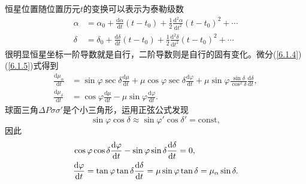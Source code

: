 \documentclass[11pt, a4paper, oneside]{ctexart}
\numberwithin{equation}{subsection}
\begin{document}
恒星位置随位置历元$t$的变换可以表示为泰勒级数
\begin{align}
\alpha&=\alpha_0+\frac{\mathrm{d}\alpha}{\mathrm{d}t}\left(t-t_0\right)+\frac12\frac{\mathrm{d}^2\alpha}{\mathrm{d}t^2}\left(t-t_0\right)^2+\cdots\\
\delta&=\delta_0+\frac{\mathrm{d}\delta}{\mathrm{d}t}\left(t-t_0\right)+\frac12\frac{\mathrm{d}^2\delta}{\mathrm{d}t^2}\left(t-t_0\right)^2+\cdots
\end{align}
很明显恒星坐标一阶导数就是自行，二阶导数则是自行的固有变化。微分(\ref{6.1.4})(\ref{6.1.5})式得到
\begin{align}
\frac{\mathrm{d}\mu_\alpha}{\mathrm{d}t}&=\sin\varphi\sec\delta\frac{\mathrm{d}\mu}{\mathrm{d}t}+\mu\cos\varphi\sec\delta\frac{\mathrm{d}\varphi}{\mathrm{d}t}+\mu\sin\varphi\frac{\sin\delta}{\cos^2\delta}\frac{\mathrm{d}\delta}{\mathrm{d}t},\label{6.1.12}\\
\frac{\mathrm{d}\mu_\delta}{\mathrm{d}t}&=\cos\varphi\frac{\mathrm{d}\mu}{\mathrm{d}t}-\mu\sin\varphi\frac{\mathrm{d}\varphi}{\mathrm{d}t}.\label{6.1.13}
\end{align}
球面三角$\Delta{}P\sigma\sigma'$是个小三角形，运用正弦公式发现
\begin{equation}
\sin\varphi\cos\delta{}\approx\sin\varphi'\cos\delta{}'=\text{const},
\end{equation}
因此
\begin{align}
&\cos\varphi\cos\delta\frac{\mathrm{d}\varphi}{\mathrm{d}t}-\sin\varphi\sin\delta\frac{\mathrm{d}\delta}{\mathrm{d}t}=0,\notag\\
&\frac{\mathrm{d}\varphi}{\mathrm{d}t}=\tan\varphi\tan\delta\frac{\mathrm{d}\delta}{\mathrm{d}t}=\mu\sin\varphi\tan\delta=\mu_\alpha\sin\delta.
\end{align}
\end{document}
